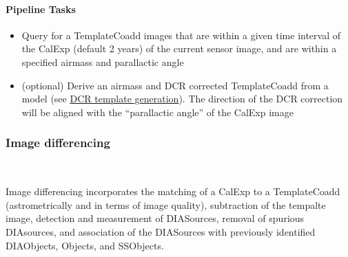 \paragraph{Pipeline Tasks}
\begin{itemize}
\item Query for a TemplateCoadd images that are within a given time interval of the CalExp  (default 2 years) of the current sensor image, and are within a specified airmass and parallactic angle
\item (optional) Derive an airmass and DCR corrected TemplateCoadd from a model (see  \hyperref[sec:acDCRTemplates]{ DCR template generation}). The direction of the DCR correction will be aligned with the 
  ``parallactic angle'' of the CalExp image
\end{itemize}

\subsubsection{Image differencing}~

Image differencing incorporates the matching of a CalExp to a TemplateCoadd (astrometrically and in terms of image quality), subtraction of the tempalte image, detection and measurement of DIASources, removal of spurious DIAsources, and association of the DIASources with previously identified DIAObjects, Objects, and SSObjects. 

